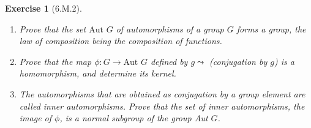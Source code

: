 \documentclass[12pt]{article}
\newtheorem*{exer}{Exercise}
\newcommand{\aut}{\text{Aut }}
\begin{document}

\begin{exer}[6.M.2]
    \begin{enumerate}
        \item Prove that the set $\aut{G}$ of automorphisms of a group $G$
            forms a group, the law of composition being the composition
            of functions.
        \item Prove that the map $\phi : G \rightarrow \aut{G}$
            defined by $g \leadsto$ (conjugation by $g$) is a
            homomorphism, and determine its kernel.
        \item The automorphisms that are obtained as conjugation by a
            group element are called inner automorphisms. Prove that the
            set of inner automorphisms, the image of $\phi$, is a normal
            subgroup of the group Aut $G$.
    \end{enumerate}
\end{exer}
\end{document}
